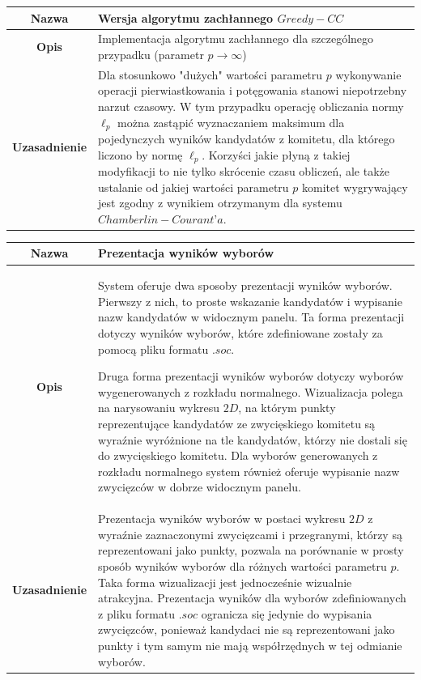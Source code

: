 \documentclass[polish,11pt]{aghthesis}
\begin{document}
{
\centering
\begin{tabular}{|c|p{10cm}|}
\hline
\textbf{Nazwa} & Wersja algorytmu zachłannego $Greedy - CC$ \\ 
\hline 
\textbf{Opis} & Implementacja algorytmu zachłannego dla szczególnego przypadku
(parametr $p \to \infty$) \\ 
\hline 
\textbf{Uzasadnienie} & Dla stosunkowo "dużych" wartości parametru $p$ wykonywanie operacji
pierwiastkowania i potęgowania stanowi niepotrzebny narzut czasowy.
W tym przypadku operację obliczania normy $\ell_p$ można zastąpić
wyznaczaniem maksimum dla pojedynczych wyników kandydatów z
komitetu, dla którego liczono by normę $\ell_p$.
Korzyści jakie płyną z takiej modyfikacji to nie tylko skrócenie czasu
obliczeń, ale także ustalanie od jakiej wartości parametru $p$ komitet
wygrywający jest zgodny z wynikiem otrzymanym dla systemu
$Chamberlin-Courant’a$.\\ 
\hline 
\end{tabular} 
}
\vspace{\baselineskip}
{
\centering
\begin{tabular}{|c|p{10cm}|}
\hline
\textbf{Nazwa} & Prezentacja wyników wyborów \\ 
\hline 
\textbf{Opis} & System oferuje dwa sposoby prezentacji wyników wyborów. Pierwszy z
nich, to proste wskazanie kandydatów i wypisanie nazw kandydatów w
widocznym panelu. Ta forma prezentacji dotyczy wyników wyborów,
które zdefiniowane zostały za pomocą pliku formatu $.soc$.

Druga forma prezentacji wyników wyborów dotyczy wyborów wygenerowanych z
rozkładu normalnego. Wizualizacja polega na narysowaniu wykresu
$2D$, na którym punkty reprezentujące kandydatów ze zwycięskiego
komitetu są wyraźnie wyróżnione na tle kandydatów, którzy nie dostali
się do zwycięskiego komitetu. Dla wyborów generowanych z rozkładu normalnego system również oferuje wypisanie nazw zwycięzców w dobrze widocznym panelu.\\ 
\hline 
\textbf{Uzasadnienie} & Prezentacja wyników wyborów w postaci wykresu $2D$ z wyraźnie
zaznaczonymi zwycięzcami i przegranymi, którzy są reprezentowani
jako punkty, pozwala na porównanie w prosty sposób wyników
wyborów dla różnych wartości parametru $p$. Taka forma wizualizacji
jest jednocześnie wizualnie atrakcyjna.
Prezentacja wyników dla wyborów zdefiniowanych z pliku formatu $.soc$
ogranicza się jedynie do wypisania zwycięzców, ponieważ kandydaci
nie są reprezentowani jako punkty i tym samym nie mają
współrzędnych w tej odmianie wyborów.\\ 
\hline 
\end{tabular} 
}
\end{document}
